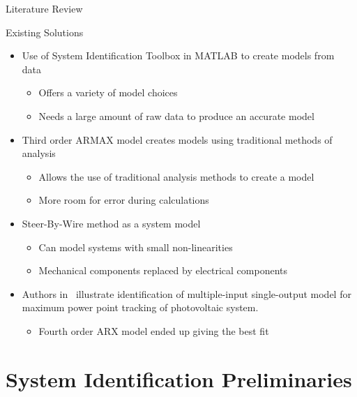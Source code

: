 \documentclass{beamer}
\begin{document}
\begin{frame}{Literature Review}{}
	\begin{block}{Existing Solutions}
 	\begin{itemize}
        \item Use of System Identification Toolbox in MATLAB to create models from data~\cite{Adnan2010}
	 \begin{itemize}
     \tiny
		    		\item Offers a variety of model choices
				\item Needs a large amount of raw data to produce an accurate model
	\end{itemize}
	\item Third order ARMAX model creates models using traditional methods of analysis~\cite{Li1999}
	 \begin{itemize}
     \tiny
		    		\item Allows the use of traditional analysis methods to create a model 
				\item More room for error during calculations
	\end{itemize}
	\item Steer-By-Wire method as a system model~\cite{Saruchi2015}
	 \begin{itemize}
     \tiny
		    		\item Can model systems with small non-linearities 
				\item Mechanical components replaced by electrical components 
	\end{itemize}
	\item Authors in~\cite{Hussain2011} illustrate identification of multiple-input single-output model for maximum power point tracking of photovoltaic system.  
	\begin{itemize}
    \tiny
		\item Fourth order ARX model ended up giving the best fit
	\end{itemize}
\end{itemize}
  \end{block}
\end{frame}

\section{System Identification Preliminaries}
\end{document}
